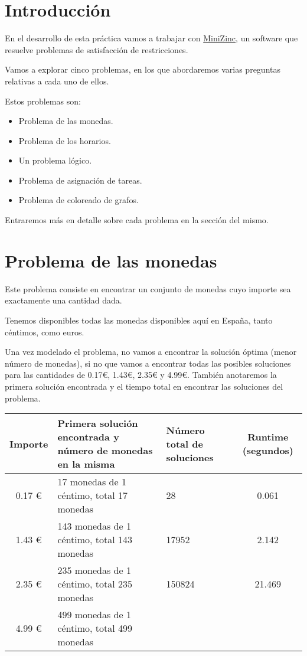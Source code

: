 \newpage %

\tableofcontents %

\newpage

\section{Introducción}

En el desarrollo de esta práctica vamos a trabajar con \href{https://www.minizinc.org/}{MiniZinc}, un software que resuelve problemas de satisfacción de restricciones.

Vamos a explorar cinco problemas, en los que abordaremos varias preguntas relativas a cada uno de ellos.

Estos problemas son:

\begin{itemize}
    \item Problema de las monedas.
    \item Problema de los horarios.
    \item Un problema lógico.
    \item Problema de asignación de tareas.
    \item Problema de coloreado de grafos.
\end{itemize}

Entraremos más en detalle sobre cada problema en la sección del mismo.

\newpage

\section{Problema de las monedas}

Este problema consiste en encontrar un conjunto de monedas cuyo importe sea exactamente una cantidad dada.

Tenemos disponibles todas las monedas disponibles aquí en España, tanto céntimos, como euros.

Una vez modelado el problema, no vamos a encontrar la solución óptima (menor número de monedas), si no que vamos a encontrar todas las posibles soluciones para las cantidades de 0.17€, 1.43€, 2.35€ y 4.99€. También anotaremos la primera solución encontrada y el tiempo total en encontrar las soluciones del problema.


\begin{tabular}{|c|p{}|p{}|c|}
    \hline
    Importe & Primera solución encontrada y número de monedas en la misma & Número total de soluciones & Runtime (segundos) \\
    \hline 0.17 € & 17 monedas de 1 céntimo, total 17 monedas & 28 & 0.061\\
    \hline 1.43 € & 143 monedas de 1 céntimo, total 143 monedas & 17952 & 2.142\\
    \hline 2.35 € & 235 monedas de 1 céntimo, total 235 monedas & 150824 & 21.469 \\
    \hline 4.99 € & 499 monedas de 1 céntimo, total 499 monedas &  & \\
    \hline
\end{tabular}


